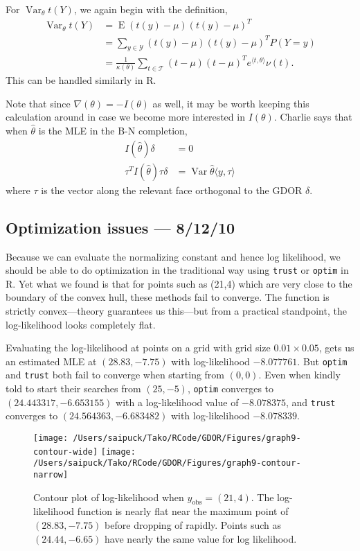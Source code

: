\documentclass{amsbook}
\DeclareMathOperator{\E}{E}
\DeclareMathOperator{\Var}{Var}
\def\YY{{\mathcal Y}}
\def\TT{{\mathcal T}}
\newcommand{\yobs}{y_{\textrm{obs}}}
\newcommand{\inner}[1]{\langle #1 \rangle}
\theoremstyle{definition}
\theoremstyle{remark}
\begin{document}
For $\Var_\theta t(Y)$, we again begin with the definition, 
\begin{align*}
\Var_\theta t(Y) &= \E (t(y) - \mu)( t(y) - \mu)^T \\
				&= \sum_{y \in \YY} (t(y) - \mu)( t(y) - \mu)^T P(Y=y)\\
				&= \frac{1}{\kappa(\theta)} \sum_{t\in \TT}
					(t - \mu)( t - \mu)^T e^{\inner{t,\theta}} \nu(t).
\end{align*}
This can be handled similarly in R.

Note that since $\nabla(\theta) = - I(\theta)$ as well, it may be worth keeping this 
calculation around in case we become more interested in $I(\theta)$.
Charlie says that when $\hat{\theta}$ is the MLE in the B-N completion,
\begin{align*}
	I(\hat{\theta}) \delta &= 0 \\
	\tau^T I(\hat{\theta}) \tau \delta &= \Var{\hat{\theta}}\inner{y, \tau}
\end{align*}
where $\tau$ is the vector along the relevant face orthogonal to the GDOR $\delta$.

\subsection{Optimization issues --- 8/12/10}
Because we can evaluate the normalizing constant and hence log likelihood, we should be able to do optimization in 
the traditional way using \texttt{trust} or \texttt{optim} in R.  Yet what we found is 
that for points such as (21,4) which are very close to the boundary of the convex hull, 
these methods fail to converge.  The function is strictly convex---theory guarantees us 
this---but from a practical standpoint, the log-likelihood looks completely flat.  

Evaluating the log-likelihood at points on a grid with grid size $0.01 \times 0.05$, gets us 
an estimated MLE at $(28.83, -7.75)$ with log-likelihood $-8.077761$.  But \texttt
{optim} and \texttt{trust} both fail to converge when starting from $(0,0)$.   Even 
when kindly told to start their searches from $(25, -5)$, \texttt{optim} converges to $
(24.443317, -6.653155)$ with a log-likelihood value of $-8.078375$, and \texttt{trust} 
converges to $(24.564363, -6.683482)$ with log-likelihood $-8.078339$.  
\begin{figure}[!h]
\centering
\texttt{[image: /Users/saipuck/Tako/RCode/GDOR/Figures/graph9-contour-wide]}
\texttt{[image: /Users/saipuck/Tako/RCode/GDOR/Figures/graph9-contour-narrow]}
\caption{Contour plot of log-likelihood when $\yobs = (21,4)$.  The log-likelihood 
function is nearly flat near the maximum point of $(28.83, -7.75)$ before dropping of 
rapidly.  Points such as $(24.44, -6.65)$ have nearly the same value for log
likelihood. }
\end{figure}
\end{document}
